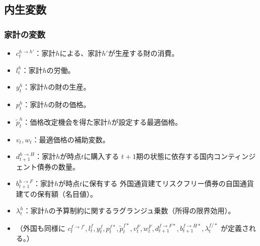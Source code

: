 \subsection*{内生変数}
\label{sec:chapter3_definitions_variables_endogenous}
\subsubsection*{家計の変数}
\label{sec:chapter3_definitions_variables_endogenous_households}
\begin{itemize}
    \item
    \label{itm:chapter3_definitions_variables_endogenous_households_c_h_h}
        \(c_t^{h\to h'}\)：家計\(h\)による、家計\(h'\)が生産する財の消費。
    \item
    \label{itm:chapter3_definitions_variables_endogenous_households_l_h}
        \(l_t^h\)：家計\(h\)の労働。
    \item
    \label{itm:chapter3_definitions_variables_endogenous_households_y_h}
        \(y_t^h\)：家計\(h\)の財の生産。
    \item
    \label{itm:chapter3_definitions_variables_endogenous_households_p_h}
        \(p_t^h\)：家計\(h\)の財の価格。
    \item
    \label{itm:chapter3_definitions_variables_endogenous_households_p_h_tilde}
        \(\widetilde{p}_t^h\)：価格改定機会を得た家計\(h\)が設定する最適価格。
    \item
    \label{itm:chapter3_definitions_variables_endogenous_households_v_w}
        \(v_t,w_t\)：最適価格の補助変数。
    \item
    \label{itm:chapter3_definitions_variables_endogenous_households_d_h_H}
        \(d_{t+1}^{h\to H}\)：家計\(h\)が時点\(t\)に購入する
        \(t+1\)期の状態に依存する国内コンティンジェント債券の数量。
    \item
    \label{itm:chapter3_definitions_variables_endogenous_households_b_h_F}
        \(b_{t+1}^{h\to F}\)：家計\(h\)が時点\(t\)に保有する
        外国通貨建てリスクフリー債券の自国通貨建ての保有額（名目値）。
    \item
    \label{itm:chapter3_definitions_variables_endogenous_households_lambda_h}
        \(\lambda_t^h\)：家計\(h\)の予算制約に関するラグランジュ乗数（所得の限界効用）。
    \item
    \label{itm:chapter3_definitions_variables_endogenous_households_foreign}
        （外国も同様に
        \(c_t^{f\to f'},l_t^f,y_t^f,p_t^{f*},\widetilde{p}_t^{f*},v_t^F,w_t^F,d_{t+1}^{f\to F*},
        b_{t+1}^{f\to H*},\lambda_t^{f/*}\)
        が定義される。）
\end{itemize}
